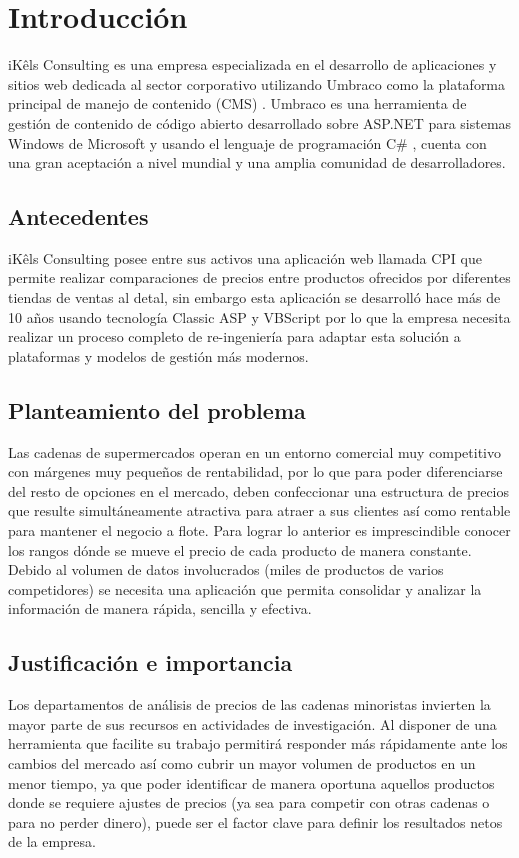 \chapter*{Introducción}
iKêls Consulting \cite{ikels} es una empresa especializada en el desarrollo de aplicaciones y sitios web dedicada al sector corporativo utilizando Umbraco como la plataforma principal de manejo de contenido (CMS) \cite{cmsBarker}. Umbraco es una herramienta de gestión de contenido de código abierto desarrollado sobre ASP.NET \cite{aspMicrosoft} para sistemas Windows de Microsoft y usando el lenguaje de programación C\# \cite{cSharpMicrosoft}, cuenta con una gran aceptación a nivel mundial y una amplia comunidad de desarrolladores.

\section*{Antecedentes}
 iKêls Consulting \cite{ikels} posee entre sus activos una aplicación web llamada CPI que permite realizar comparaciones de precios entre productos ofrecidos por diferentes tiendas de ventas al detal, sin embargo esta aplicación se desarrolló hace más de 10 años usando tecnología Classic ASP y VBScript por lo que la empresa necesita realizar un proceso completo de re-ingeniería para adaptar esta solución a plataformas y modelos de gestión más modernos.


\section*{Planteamiento del problema}
Las cadenas de supermercados operan en un entorno comercial muy competitivo con márgenes muy pequeños de rentabilidad, por lo que para poder diferenciarse del resto de opciones en el mercado, deben confeccionar una estructura de precios que resulte simultáneamente atractiva para atraer a sus clientes así como rentable para mantener el negocio a flote.
Para lograr lo anterior es imprescindible conocer los rangos dónde se mueve el precio de cada producto de manera constante. Debido al volumen de datos involucrados (miles de productos de varios competidores) se necesita una aplicación que permita consolidar y analizar la información de manera rápida, sencilla y efectiva.
\section*{Justificación e importancia}
Los departamentos de análisis de precios de las cadenas minoristas invierten la mayor parte de sus recursos en actividades de investigación.
Al disponer de una herramienta que facilite su trabajo permitirá responder más rápidamente ante los cambios del mercado así como cubrir un mayor volumen de productos en un menor  tiempo, ya que  poder identificar de manera oportuna aquellos productos donde se requiere ajustes de precios (ya sea para competir con otras cadenas o para no perder dinero), puede ser el factor clave para definir los resultados netos de la empresa.
